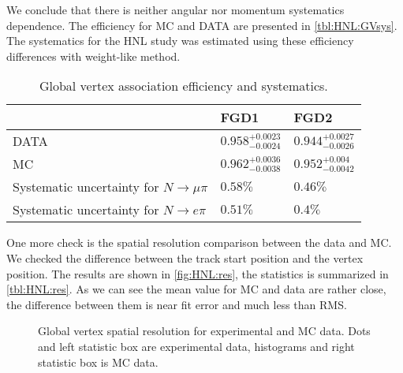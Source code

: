\documentclass[../main.tex]{subfiles}
\begin{document}
We conclude that there is neither angular nor momentum systematics dependence. The efficiency for MC and DATA are presented in \autoref{tbl:HNL:GVsys}. The systematics for the HNL study was estimated using these efficiency differences with weight-like method.
\begin{table}[!ht]
\begin{center}
\begin{tabular}{|l|l|l|}
    \hline
    & FGD1 & FGD2 \\
    \hline
    DATA   & $0.958^{+0.0023}_{-0.0024}$ & $0.944^{+0.0027}_{-0.0026}$  \\
    \hline
    MC      & $0.962^{+0.0036}_{-0.0038}$ & $0.952^{+0.004}_{-0.0042}$  \\
    \hline
    Systematic uncertainty for $N\to\mu\pi$ & $0.58\%$ & $0.46\%$ \\
    \hline
    Systematic uncertainty for $N\to e\pi$ & $0.51\%$ & $0.4\%$ \\
    \hline

\end{tabular}
\caption{Global vertex association efficiency and systematics.}
\label{tbl:HNL:GVsys}
\end{center}
\end{table}
One more check is the spatial resolution comparison between the data and MC. We checked the difference between the track start position and the vertex position. The results are shown in \autoref{fig:HNL:res}, the statistics is summarized in \autoref{tbl:HNL:res}. As we can see the mean value for MC and data are rather close, the difference between them is near fit error and much less than RMS.
\begin{figure}[!ht]
\begin{center}
    \begin{minipage}{0.49\linewidth}
    \end{minipage}
    \hfill
    \begin{minipage}{0.49\linewidth}
    \end{minipage}
    \vfill
    \begin{minipage}{0.49\linewidth}
    \end{minipage}
    \caption{Global vertex spatial resolution for experimental and MC data. Dots and left statistic box are experimental data, histograms and right statistic box is MC data.}
    \label{fig:HNL:res}
\end{center}
\end{figure}
\end{document}
